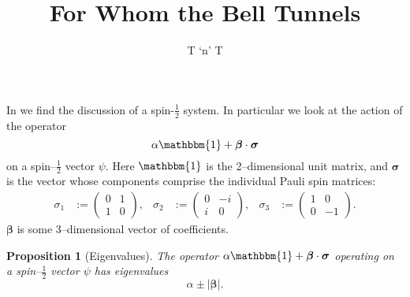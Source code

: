 \documentclass[12pt]{article}
\title{For Whom the Bell Tunnels}
\author{T `n' T}
\newtheorem{prop}[thm]{Proposition}
\begin{document}
\maketitle

In \cite[p.448]{Bell1966} we find the discussion of a spin-$\frac{1}{2}$ system.  In particular we look at the action of the operator
\begin{displaymath}
  \alpha \mathbbm{1} + \bm{\beta} \cdot \bm{\sigma}
\end{displaymath}
on a spin--$\frac{1}{2}$ vector $\psi$.  Here $\mathbbm{1}$ is the 2--dimensional unit matrix, and $\bm{\sigma}$ is the vector whose components comprise the individual Pauli spin matrices:
\begin{align*}
  \sigma_1 &:= \begin{pmatrix}
                 0 & 1 \\
                 1 & 0
               \end{pmatrix},
              &
  \sigma_2 &:= \begin{pmatrix}
                 0 & -i \\
                 i & 0
               \end{pmatrix},
              &
  \sigma_3 &:= \begin{pmatrix}
                 1 & 0 \\
                 0 & -1
               \end{pmatrix}.
\end{align*}
$\bm{\beta}$ is some 3--dimensional vector of coefficients.

\begin{prop}[Eigenvalues]
  The operator $\alpha \mathbbm{1} + \bm{\beta} \cdot \bm{\sigma}$ operating on a spin--$\frac{1}{2}$ vector $\psi$ has eigenvalues
  \begin{displaymath}
    \alpha \pm |\bm{\beta}|.
  \end{displaymath}
\end{prop}
\end{document}
